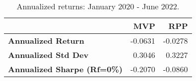 \begin{table}[!htb]
    \centering
      \begingroup
\fontsize{9}{9}
\selectfont
\begin{tabular}{>{}lrr}
	\toprule
	                                    & MVP     & RPP     \\
	\midrule
	\textbf{Annualized Return}          & -0.0631 & -0.0278 \\
	\textbf{Annualized Std Dev}         & 0.3046  & 0.3227  \\
	\textbf{Annualized Sharpe (Rf=0\%)} & -0.2070 & -0.0860 \\
	\bottomrule
\end{tabular}
\caption{Annualized returns: January 2020 - June 2022.}
\label{tab:RPP2}  %
\endgroup{}
\end{table}